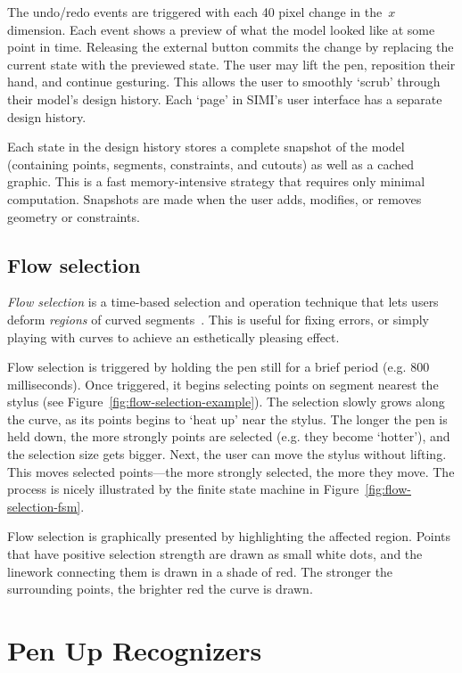 The undo/redo events are triggered with each 40 pixel change in
the~$x$ dimension. Each event shows a preview of what the model looked
like at some point in time. Releasing the external button commits the
change by replacing the current state with the previewed state. The
user may lift the pen, reposition their hand, and continue
gesturing. This allows the user to smoothly `scrub' through their
model's design history. Each `page' in SIMI's user interface has a
separate design history.

Each state in the design history stores a complete snapshot of the
model (containing points, segments, constraints, and cutouts) as well
as a cached graphic. This is a fast memory-intensive strategy that
requires only minimal computation. Snapshots are made when the user
adds, modifies, or removes geometry or constraints.

\subsection{Flow selection}



\textit{Flow selection} is a time-based selection and operation
technique that lets users deform \textit{regions} of curved
segments~\cite{johnson-flow-selection}. This is useful for fixing
errors, or simply playing with curves to achieve an esthetically
pleasing effect.

Flow selection is triggered by holding the pen still for a brief
period (e.g. 800 milliseconds). Once triggered, it begins selecting
points on segment nearest the stylus (see
Figure~\ref{fig:flow-selection-example}). The selection slowly grows
along the curve, as its points begins to `heat up' near the
stylus. The longer the pen is held down, the more strongly points are
selected (e.g. they become `hotter'), and the selection size gets
bigger. Next, the user can move the stylus without lifting. This moves
selected points---the more strongly selected, the more they move. The
process is nicely illustrated by the finite state machine in
Figure~\ref{fig:flow-selection-fsm}.

Flow selection is graphically presented by highlighting the affected
region. Points that have positive selection strength are drawn as
small white dots, and the linework connecting them is drawn in a shade
of red. The stronger the surrounding points, the brighter red the
curve is drawn.

\section{Pen Up Recognizers}

